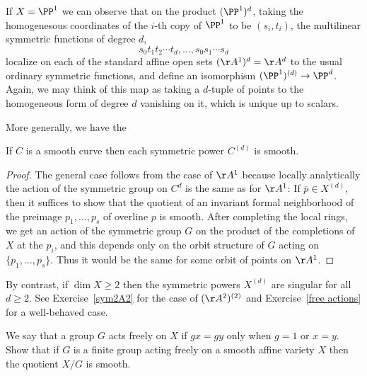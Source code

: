 If $X = \PP^1$ we can observe that on the product $(\PP^1)^d$, taking the homogenesous coordinates of the
$i$-th copy of $\PP^1$ to be $(s_i,t_i)$, the multilinear symmetric functions of degree $d$,
$$
s_0t_1t_2\cdots t_d,\dots,s_0s_1\cdots s_d
$$
localize on each of the standard affine open sets $(\AA^1)^d=\AA^d$ to the usual ordinary symmetric functions, and define
an isomorphism $(\PP^1)^{(d)} \to \PP^d$.
Again, we may think of this map as taking a $d$-tuple of points to the
homogeneous form of degree $d$ vanishing on it, which is unique up to scalars.

More generally, we have the

\begin{proposition}
If $C$ is a smooth curve then each symmetric power $C^{(d)}$ is smooth.
\end{proposition}

\begin{proof}
 The general case follows from the case of $\AA^{1}$ because locally analytically the action of the symmetric group on $C^d$ is the same as for $\AA^1$: If  $\overline p \in X^{(d)}$, then it suffices to
 show that the quotient of an invariant formal neighborhood of the preimage $p_1,\dots, p_s$ of
 overline $p$ is smooth. After completing the local rings, we get an action of the symmetric group
 $G$ on the product of the completions of $X$ at the $p_i$, and this depends only on the orbit
 structure of $G$ acting on $\{p_1,\dots, p_s\}$. Thus it would be the same for some orbit of
 points on $\AA^1$.
 \end{proof}

By contrast, if $\dim X \geq 2$ then the symmetric powers $X^{(d)}$ are singular for all $d \geq 2$.
See Exercise~\ref{sym2A2} for the case of $(\AA^2)^{(2)}$ and Exercise~\ref{free actions} for a well-behaved case.

\begin{exercise}\label{free actions}
We say that a group $G$ acts freely on $X$ if $gx = gy$ only when $g =1$ or $x=y$. Show that
 if $G$ is a finite group acting freely on a smooth affine variety $X$ then the quotient $X/G$ is smooth.
\end{exercise}

